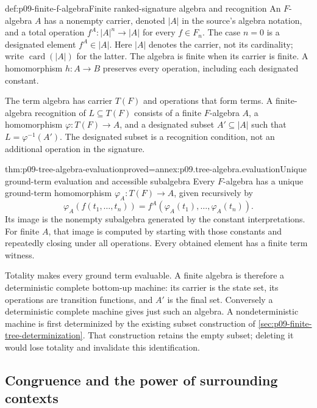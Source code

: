 \begin{hbdefinition}{def:p09-finite-f-algebra}{Finite ranked-signature algebra and recognition}
An \(F\)-algebra \(A\) has a nonempty carrier, denoted \(|A|\) in the
source's algebra notation, and a total operation
\(f^A:|A|^n\to|A|\) for every \(f\in F_n\).
The case \(n=0\) is a designated element \(f^A\in|A|\).
Here \(|A|\) denotes the carrier, not its cardinality; write
\(\operatorname{card}(|A|)\) for the latter.
The algebra is finite when its carrier is finite.
A homomorphism \(h:A\to B\) preserves every operation, including
each designated constant.

The term algebra has carrier \(T(F)\) and operations that form terms.
A finite-algebra recognition of \(L\subseteq T(F)\) consists of
a finite \(F\)-algebra \(A\), a homomorphism
\(\varphi:T(F)\to A\), and a designated subset \(A'\subseteq|A|\)
such that \(L=\varphi^{-1}(A')\).
The designated subset is a recognition condition, not an additional
operation in the signature.
\end{hbdefinition}

\begin{hblemma}{thm:p09-tree-algebra-evaluation}{proved=annex:p09.tree-algebra.evaluation}{Unique ground-term evaluation and accessible subalgebra}
Every \(F\)-algebra has a unique ground-term homomorphism
\(\varphi_A:T(F)\to A\), given recursively by
\[
 \varphi_A(f(t_1,\ldots,t_n))
       =f^A(\varphi_A(t_1),\ldots,\varphi_A(t_n)).
\]
Its image is the nonempty subalgebra generated by the constant
interpretations. For finite \(A\), that image is computed by starting
with those constants and repeatedly closing under all operations.
Every obtained element has a finite term witness.
\end{hblemma}

Totality makes every ground term evaluable. A finite algebra is therefore
a deterministic complete bottom-up machine: its carrier is the state
set, its operations are transition functions, and \(A'\) is the final
set. Conversely a deterministic complete machine gives just such an
algebra. A nondeterministic machine is first determinized by the existing
subset construction of \cref{sec:p09-finite-tree-determinization}.
That construction retains the empty subset; deleting it would lose
totality and invalidate this identification.

\subsection{Congruence and the power of surrounding contexts}
\label{sec:p09-tree-context-congruence}

